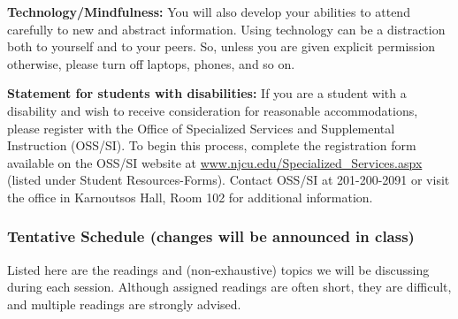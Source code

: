 \documentclass[]{article}
\begin{document}
\textbf{Technology/Mindfulness:} You will also develop your abilities to
attend carefully to new and abstract information. Using technology can
be a distraction both to yourself and to your peers. So, unless you are
given explicit permission otherwise, please turn off laptops, phones,
and so on.

\textbf{Statement for students with disabilities:} If you are a student
with a disability and wish to receive consideration for reasonable
accommodations, please register with the Office of Specialized Services
and Supplemental Instruction (OSS/SI). To begin this process, complete
the registration form available on the OSS/SI website at
\href{http://www.njcu.edu/Specialized_Services.aspx}{www.njcu.edu/Specialized\_Services.aspx}
(listed under Student Resources-Forms). Contact OSS/SI at 201-200-2091
or visit the office in Karnoutsos Hall, Room 102 for additional
information.

\subsubsection{Tentative Schedule (changes will be announced in
class)}\label{tentative-schedule-changes-will-be-announced-in-class}

Listed here are the readings and (non-exhaustive) topics we will be
discussing during each session. Although assigned readings are often
short, they are difficult, and multiple readings are strongly advised.

\begin{enumerate}

\end{enumerate}
\end{document}
